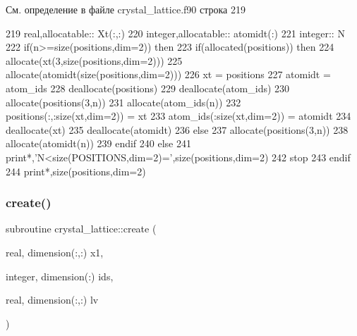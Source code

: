 См. определение в файле crystal\+\_\+lattice.\+f90 строка 219


\begin{DoxyCode}
219     \textcolor{keywordtype}{real},\textcolor{keywordtype}{allocatable}:: Xt(:,:)
220     \textcolor{keywordtype}{integer},\textcolor{keywordtype}{allocatable}:: atomidt(:)
221     \textcolor{keywordtype}{integer}:: N
222     \textcolor{keywordflow}{if}(n>=\textcolor{keyword}{size}(positions,dim=2)) \textcolor{keywordflow}{then}
223         \textcolor{keywordflow}{if}(\textcolor{keyword}{allocated}(positions)) \textcolor{keywordflow}{then}
224             \textcolor{keyword}{allocate}(xt(3,\textcolor{keyword}{size}(positions,dim=2)))
225             \textcolor{keyword}{allocate}(atomidt(\textcolor{keyword}{size}(positions,dim=2)))
226             xt = positions
227             atomidt = atom\_ids
228             \textcolor{keyword}{deallocate}(positions)
229             \textcolor{keyword}{deallocate}(atom\_ids)
230             \textcolor{keyword}{allocate}(positions(3,n))
231             \textcolor{keyword}{allocate}(atom\_ids(n))
232             positions(:,:\textcolor{keyword}{size}(xt,dim=2)) = xt
233             atom\_ids(:\textcolor{keyword}{size}(xt,dim=2)) = atomidt
234             \textcolor{keyword}{deallocate}(xt)
235             \textcolor{keyword}{deallocate}(atomidt)
236         \textcolor{keywordflow}{else}
237             \textcolor{keyword}{allocate}(positions(3,n))
238             \textcolor{keyword}{allocate}(atomidt(n))
239 \textcolor{keywordflow}{        endif}
240     \textcolor{keywordflow}{else}
241         print*,\textcolor{stringliteral}{'N<size(POSITIONS,dim=2)='},\textcolor{keyword}{size}(positions,dim=2)
242         stop
243 \textcolor{keywordflow}{    endif}
244     print*,\textcolor{keyword}{size}(positions,dim=2)
\end{DoxyCode}
\mbox{\label{namespacecrystal__lattice_ad70644846195cc9116b59bbc5c0c486b}} 
\subsubsection{\texorpdfstring{create()}{create()}}
{\footnotesize\ttfamily subroutine crystal\+\_\+lattice\+::create (\begin{DoxyParamCaption}\item[{real, dimension(\+:,\+:)}]{x1,  }\item[{integer, dimension(\+:)}]{ids,  }\item[{real, dimension(\+:,\+:)}]{lv }\end{DoxyParamCaption})}



